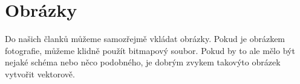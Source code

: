 \documentclass[11pt, a4paper]{article}
\begin{document}
\section{Obrázky}
    Do našich članků můžeme samozřejmě vkládat obrázky. Pokud je obrázkem fotografie, můžeme klidně použít bitmapový soubor. Pokud by to ale mělo být nejaké schéma nebo něco podobného, je dobrým zvykem takovýto obrázek vytvořit vektorově.
    \begin{figure}[h]
    \begin{center}
\end{center}
\end{figure}
\end{document}
